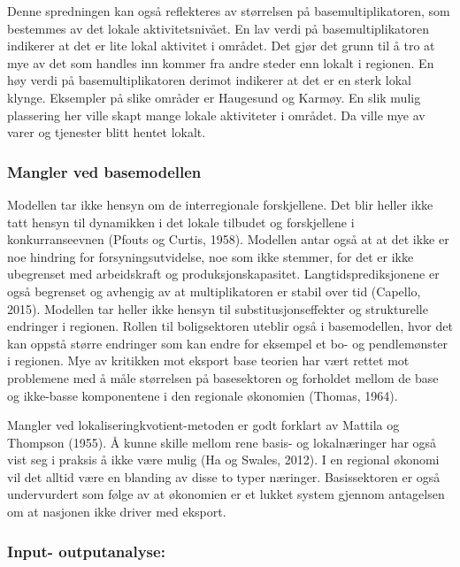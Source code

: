 \documentclass[
]{article}
\begin{document}
Denne spredningen kan også reflekteres av størrelsen på
basemultiplikatoren, som bestemmes av det lokale aktivitetsnivået. En
lav verdi på basemultiplikatoren indikerer at det er lite lokal
aktivitet i området. Det gjør det grunn til å tro at mye av det som
handles inn kommer fra andre steder enn lokalt i regionen. En høy verdi
på basemultiplikatoren derimot indikerer at det er en sterk lokal
klynge. Eksempler på slike områder er Haugesund og Karmøy. En slik mulig
plassering her ville skapt mange lokale aktiviteter i området. Da ville
mye av varer og tjenester blitt hentet lokalt.

\hypertarget{mangler-ved-basemodellen}{%
\subsubsection{Mangler ved
basemodellen}\label{mangler-ved-basemodellen}}

Modellen tar ikke hensyn om de interregionale forskjellene. Det blir
heller ikke tatt hensyn til dynamikken i det lokale tilbudet og
forskjellene i konkurranseevnen (Pfouts og Curtis, 1958). Modellen antar
også at at det ikke er noe hindring for forsyningsutvidelse, noe som
ikke stemmer, for det er ikke ubegrenset med arbeidskraft og
produksjonskapasitet. Langtidsprediksjonene er også begrenset og
avhengig av at multiplikatoren er stabil over tid (Capello, 2015).
Modellen tar heller ikke hensyn til substitusjonseffekter og
strukturelle endringer i regionen. Rollen til boligsektoren uteblir også
i basemodellen, hvor det kan oppstå større endringer som kan endre for
eksempel et bo- og pendlemønster i regionen. Mye av kritikken mot
eksport base teorien har vært rettet mot problemene med å måle
størrelsen på basesektoren og forholdet mellom de base og ikke-basse
komponentene i den regionale økonomien (Thomas, 1964).

Mangler ved lokaliseringkvotient-metoden er godt forklart av Mattila og
Thompson (1955). Å kunne skille mellom rene basis- og lokalnæringer har
også vist seg i praksis å ikke være mulig (Ha og Swales, 2012). I en
regional økonomi vil det alltid være en blanding av disse to typer
næringer. Basissektoren er også undervurdert som følge av at økonomien
er et lukket system gjennom antagelsen om at nasjonen ikke driver med
eksport.

\hypertarget{input--outputanalyse}{%
\subsubsection{Input- outputanalyse:}\label{input--outputanalyse}}
\end{document}
